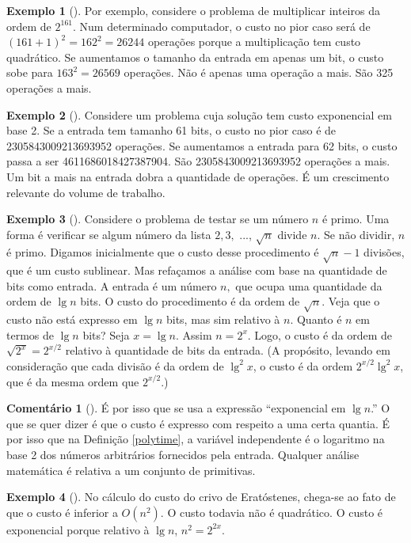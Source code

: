 \documentclass{article}
\theoremstyle{definition}
\newtheorem{example}{Exemplo}[section]
\newtheorem{remark}{Comentário}[section]
\theoremstyle{pf}
\newcommand{\refdef}[1]{Definição \ref{#1}}
\newcommand{\rem}[1]{\jmp\begin{remark}[#1]}
\newcommand{\mer}{\end{remark}}
\newcommand{\ex}[1]{\jmp\begin{example}[#1]}
\newcommand{\xe}{\end{example}}
\newcommand{\jmp}{\vspace{3pt}}
\begin{document}
\ex{} Por exemplo, considere o problema de multiplicar inteiros da
ordem de $2^{161}$. Num determinado computador, o custo no pior caso
será de $(161+1)^2 = 162^2 = 26244$ operações porque a multiplicação
tem custo quadrático. Se aumentamos o tamanho da entrada em apenas um
bit, o custo sobe para $163^2 = 26569$ operações. Não é apenas uma
operação a mais. São 325 operações a mais.\xe

\ex{} Considere um problema cuja solução tem custo exponencial em base
2. Se a entrada tem tamanho 61 bits, o custo no pior caso é de
2305843009213693952 operações. Se aumentamos a entrada para 62 bits, o
custo passa a ser 4611686018427387904. São 2305843009213693952
operações a mais. Um bit a mais na entrada dobra a quantidade de
operações. É um crescimento relevante do volume de trabalho.\xe

\ex{} Considere o problema de testar se um número $n$ é primo. Uma
forma é verificar se algum número da lista $2, 3,$ ..., $\sqrt{n}$
divide $n.$ Se não dividir, $n$ é primo. Digamos inicialmente que o
custo desse procedimento é $\sqrt{n} - 1$ divisões, que é um custo
sublinear. Mas refaçamos a análise com base na quantidade de bits como
entrada. A entrada é um número $n,$ que ocupa uma quantidade da ordem
de $\lg n$ bits. O custo do procedimento é da ordem de $\sqrt{n}.$
Veja que o custo não está expresso em $\lg n$ bits, mas sim relativo à
$n.$ Quanto é $n$ em termos de $\lg n$ bits? Seja $x = \lg n.$ Assim
$n = 2^x.$ Logo, o custo é da ordem de $\sqrt{2^x} = 2^{x/2}$ relativo
à quantidade de bits da entrada.  (A propósito, levando em
consideração que cada divisão é da ordem de $\lg^2 x$, o custo é da
ordem $2^{x/2} \lg^2 x$, que é da mesma ordem que $2^{x/2}$.)\xe

\rem{} É por isso que se usa a expressão ``exponencial em $\lg n$.''
O que se quer dizer é que o custo é expresso com respeito a uma certa
quantia.  É por isso que na \refdef{polytime}, a variável independente
é o logaritmo na base 2 dos números arbitrários fornecidos pela
entrada.  Qualquer análise matemática é relativa a um conjunto de
primitivas. \mer

\ex{} No cálculo do custo do crivo de Eratóstenes\cite[página 17,
  18]{scc}, chega-se ao fato de que o custo é inferior a $O(n^2)$.  O
custo todavia não é quadrático.  O custo é exponencial porque relativo
à $\lg n$, $n^2 = 2^{2x}.$\xe

\printbibliography 
 
\end{document}

